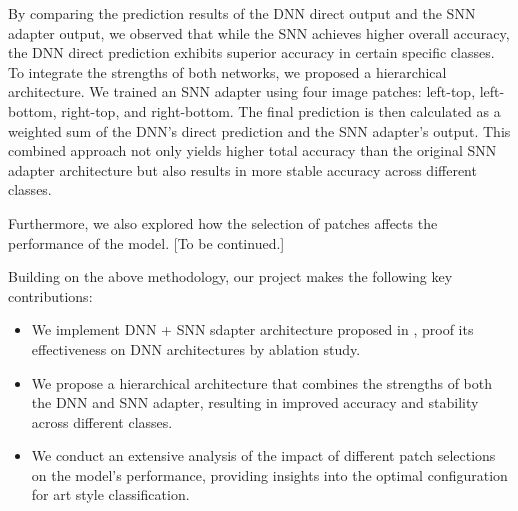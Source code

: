 By comparing the prediction results of the DNN direct output and the SNN adapter output, we observed that while the SNN achieves higher overall accuracy, the DNN direct prediction exhibits superior accuracy in certain specific classes. To integrate the strengths of both networks, we proposed a hierarchical architecture. We trained an SNN adapter using four image patches: left-top, left-bottom, right-top, and right-bottom. The final prediction is then calculated as a weighted sum of the DNN's direct prediction and the SNN adapter's output. This combined approach not only yields higher total accuracy than the original SNN adapter architecture but also results in more stable accuracy across different classes.

Furthermore, we also explored how the selection of patches affects the performance of the model. [To be continued.]

Building on the above methodology, our project makes the following key contributions: 
\begin{itemize}
    \item We implement DNN + SNN sdapter architecture proposed in \cite{imran2023artistic}, proof its effectiveness on  DNN architectures by ablation study.
    \item We propose a hierarchical architecture that combines the strengths of both the DNN and SNN adapter, resulting in improved accuracy and stability across different classes.
    \item We conduct an extensive analysis of the impact of different patch selections on the model's performance, providing insights into the optimal configuration for art style classification.
\end{itemize}
